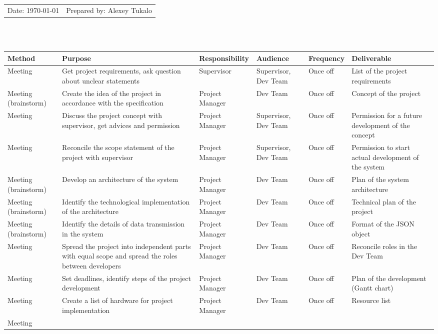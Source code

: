 \documentclass[english]{article}
\begin{document}
\begin{tabular}{l l}
Date: \today  & Prepared by: Alexey Tukalo\\
\end{tabular}\\\\
\begin{tabular}{|p{1.5cm}|p{3.5cm}|p{2.5cm}|p{1.5cm}|p{1.5cm}|p{3cm}|}
\hline
Method & Purpose & Responsibility & Audience & Frequency & Deliverable\\
\hline
Meeting & 
Get project requirements, ask question about unclear statements &
Supervisor &
Supervisor, Dev Team &
Once off &
List of the project requirements \\
\hline 
Meeting (brainstorm) & 
Create the idea of the project in accordance with the specification &
Project Manager &
Dev Team &
Once off &
Concept of the project \\
\hline 
Meeting & 
Discuss the project concept with supervisor, get advices and permission &
Project Manager &
Supervisor, Dev Team &
Once off &
Permission for a future development of the concept\\
\hline 
Meeting & 
Reconcile the scope statement of the project with supervisor &
Project Manager &
Supervisor, Dev Team &
Once off &
Permission to start actual development of the system\\
\hline 
Meeting (brainstorm) & 
Develop an architecture of the system &
Project Manager &
Dev Team &
Once off &
Plan of the system architecture\\
\hline 
Meeting (brainstorm) & 
Identify the technological implementation of the architecture &
Project Manager &
Dev Team &
Once off &
Technical plan of the project\\
\hline 
Meeting (brainstorm) & 
Identify the details of data transmission in the system &
Project Manager &
Dev Team &
Once off &
Format of the JSON object\\
\hline 
Meeting & 
Spread the project into independent parts with equal scope and spread the roles between developers &
Project Manager &
Dev Team &
Once off &
Reconcile roles in the Dev Team\\
\hline 
Meeting & 
Set deadlines, identify steps of the project development &
Project Manager &
Dev Team &
Once off &
Plan of the development (Gantt chart)\\
\hline 
Meeting & 
Create a list of hardware for project implementation &
Project Manager &
Dev Team &
Once off &
Resource list\\
\hline 
Meeting & 

\end{tabular}
\end{document}
